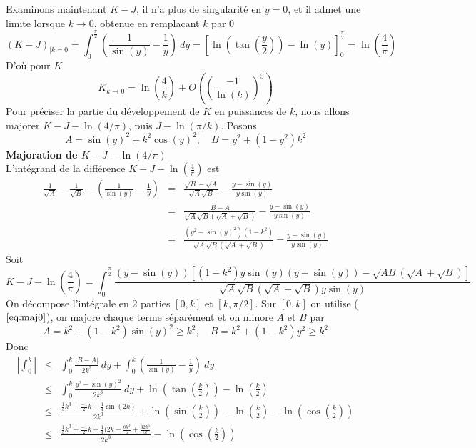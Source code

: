 \documentclass[a4paper,11pt]{article}
\begin{document}
\begin{giacjshere}
Examinons maintenant $K-J$, il n'a plus de singularit\'e en $y=0$, et il admet une limite
lorsque $k \rightarrow 0$, obtenue en remplacant $k$ par 0
\[ (K-J)_{|k=0} = \int_0^{\frac{\pi}{2}} \left(\frac{1}{\sin(y)}-\frac{1}{y}\right)
\ dy = \left[\ln\left(\tan\left(\frac{y}{2}\right)\right) - \ln(y) \right]_0^{\frac{\pi}{2}} =
\ln(\frac{4}{\pi})\]
D'o\`u pour $K$
\[ K_{k \rightarrow 0} = \ln\left(\frac{4}{k}\right) + O( \left(\frac{-1}{\ln(k)}\right)^5)\]
Pour pr\'eciser la partie du d\'eveloppement de $K$ en puissances de $k$, nous allons
majorer $K-J-\ln(4/\pi)$, puis $J-\ln(\pi/k)$.
Posons
\[ A=\sin(y)^2+k^2 \cos(y)^2, \quad B=y^2+(1-y^2)k^2\]
{\bf Majoration de $K-J-\ln(4/\pi)$}\\
L'int\'egrand de la diff\'erence $K-J-\ln(\frac{4}{\pi})$ est
\begin{eqnarray}  
\frac{1}{\sqrt{A}} - \frac{1}{\sqrt{B}} - 
\left( \frac{1}{\sin(y)}-\frac{1}{y} \right)
&= &
\frac{\sqrt{B}-\sqrt{A}}{\sqrt{A} \sqrt{B}} -
\frac{y-\sin(y)}{y\sin(y)} 
 \\
&= &
\frac{B-A}{\sqrt{A} \sqrt{B} (\sqrt{A}+\sqrt{B})} -
\frac{y-\sin(y)}{y\sin(y)} \label{eq:maj0}
 \\
&=& \frac{(y^2-\sin(y)^2)(1-k^2)}{\sqrt{A} \sqrt{B} (\sqrt{A}+\sqrt{B})}
- \frac{y-\sin(y)}{y\sin(y)} \label{eq:maj1}
\end{eqnarray}
Soit
\begin{equation} \label{eq:maj2}
 K-J-\ln(\frac{4}{\pi})= \int_0^{\frac{\pi}{2}} 
\frac{(y-\sin(y))[(1-k^2)y \sin(y)(y+\sin(y))-\sqrt{AB}(\sqrt{A}+\sqrt{B})]}
{\sqrt{A} \sqrt{B} (\sqrt{A}+\sqrt{B})y\sin(y)}
\end{equation}
On décompose l'intégrale en 2 parties $[0,k]$ et $[k,\pi/2]$.
Sur $[0,k]$ on utilise (\(\ref{eq:maj0}\)), on majore chaque terme séparément
et on minore $A$ et $B$ par
\[ A=k^2+(1-k^2)\sin(y)^2 \geq k^2, \quad B=k^2+(1-k^2)y^2 \geq k^2\]
Donc
\begin{eqnarray*} 
| \int_0^{k} | &\leq &\int_0^k \frac{|B-A|}{2k^3} \ dy + \int_0^k ( \frac{1}{\sin(y)}-\frac{1}{y} ) 
\ dy \\
&\leq& \int_0^k \frac{y^2-\sin(y)^2}{2k^3} \ dy + \ln (\tan(\frac{k}{2})) -\ln(\frac{k}{2}) \\
&\leq & \frac{\frac{1}{3} k^{3}+\frac{-1}{2} k+\frac{1}{4} \sin(2 k)}{2 k^{3}} 
+ \ln (\sin(\frac{k}{2})) -\ln(\frac{k}{2}) - \ln (\cos(\frac{k}{2}))
\\
&\leq & \frac{\frac{1}{3} k^{3}+\frac{-1}{2} k+\frac{1}{4} (2k-\frac{8k^3}{6}+\frac{32k^5}{5!}}{2 k^{3}} - \ln (\cos(\frac{k}{2})) \\

\end{eqnarray*}
\end{giacjshere}
\end{document}
